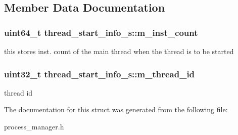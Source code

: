 \subsection{Member Data Documentation}
\hypertarget{structthread__start__info__s_ab1635b429a81daf00cf5272114b94a1b}{
\subsubsection[{m\_\-inst\_\-count}]{\setlength{\rightskip}{0pt plus 5cm}uint64\_\-t {\bf thread\_\-start\_\-info\_\-s::m\_\-inst\_\-count}}}
\label{structthread__start__info__s_ab1635b429a81daf00cf5272114b94a1b}
this stores inst. count of the main thread when the thread is to be started \hypertarget{structthread__start__info__s_a957332c460e5f4b4199921a6d1cb99da}{
\subsubsection[{m\_\-thread\_\-id}]{\setlength{\rightskip}{0pt plus 5cm}uint32\_\-t {\bf thread\_\-start\_\-info\_\-s::m\_\-thread\_\-id}}}
\label{structthread__start__info__s_a957332c460e5f4b4199921a6d1cb99da}
thread id 

The documentation for this struct was generated from the following file:\begin{DoxyCompactItemize}
\item 
process\_\-manager.h\end{DoxyCompactItemize}
